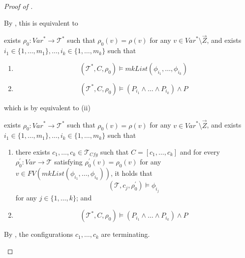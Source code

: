 \documentclass{article}
\newcommand{\Tcfg}{\mathcal{T}_{\mathit{Cfg}}}
\newenvironment{proofenv}
  {
    \VerbatimEnvironment\begin{tcolorbox}[colback=black!0!white] %
  }
  {
   \end{tcolorbox}
  }
\begin{document}
\begin{proof}[Proof of ]
\begin{enumerate}
\begin{proofenv}
    \end{proofenv}
    By , this is equivalent to
    \begin{proofenv}
    exists $\rho_0 : \mathit{Var}^* \to \mathcal{T}^*$ such that $\rho_0(v) = \rho(v)$ for any $v \in \mathit{Var}^* \setminus \vec{Z}$, and exists $i_1 \in \{ 1, \ldots, m_1 \}, \ldots, i_k \in \{ 1, \ldots, m_k \}$ such that
    \begin{enumerate}
        \item 
        \begin{equation*}
            (\mathcal{T}^*, C, \rho_0) \vDash \mathit{mkList}(\phi_{i_1}, \ldots, \phi_{i_k})
        \end{equation*}
        \item 
        \begin{equation*}
            (\mathcal{T}^*, C, \rho_0) \vDash (P_{i_1} \land \ldots \land P_{i_k}) \land P
        \end{equation*}
    \end{enumerate}
    \end{proofenv}
    which is by  equivalent to (ii)
    \begin{proofenv}
    exists $\rho_0 : \mathit{Var}^* \to \mathcal{T}^*$ such that $\rho_0(v) = \rho(v)$ for any $v \in \mathit{Var}^* \setminus \vec{Z}$, and exists $i_1 \in \{ 1, \ldots, m_1 \}, \ldots, i_k \in \{ 1, \ldots, m_k \}$ such that
    \begin{enumerate}
        \item there exists $c_1,\ldots,c_k \in \Tcfg$ such that $C = [c_1,\ldots,c_k]$
        and for every $\rho_0^\prime : \mathit{Var} \to \mathcal{T}$ satisfying $\rho_0^\prime(v) = \rho_0(v)$
        for any $v \in \mathit{FV}(\mathit{mkList}(\phi_{i_1}, \ldots, \phi_{i_k}))$, it holds that
        \begin{equation*}
            (\mathcal{T}, c_j, \rho_0^\prime) \vDash \phi_{i_j}
        \end{equation*}
        for any $j \in \{ 1, \ldots, k \}$; and
        \item
        \begin{equation*}
            (\mathcal{T}^*, C, \rho_0) \vDash (P_{i_1} \land \ldots \land P_{i_k}) \land P
        \end{equation*}
    \end{enumerate}
    \end{proofenv}
    By , the configurations $c_1, \ldots, c_k$ are terminating.

\end{enumerate}
\end{proof}
\end{document}
